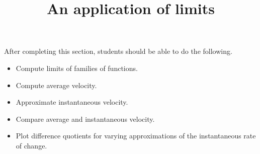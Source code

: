 \documentclass{ximera}
\title{An application of limits}
\begin{document}
\begin{abstract}
\end{abstract}

\maketitle

\begin{sectionOutcomes}

After completing this section, students should be able to do the following.

\begin{itemize}
\item Compute limits of families of functions. 
\item Compute average velocity.
\item Approximate instantaneous velocity.
\item Compare average and instantaneous velocity.
\item Plot difference quotients for varying approximations of the
  instantaneous rate of change.
\end{itemize}

\end{sectionOutcomes}
\end{document}
